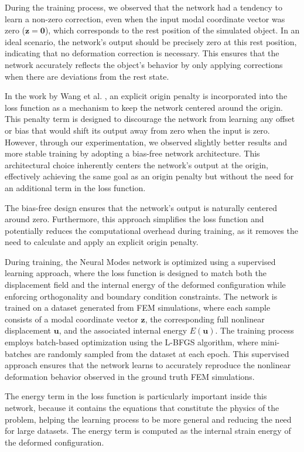 During the training process, we observed that the network had a tendency to learn a non-zero correction, even when the input modal coordinate vector was zero (\(\bm{z} = \bm{0}\)), which corresponds to the rest position of the simulated object. In an ideal scenario, the network's output should be precisely zero at this rest position, indicating that no deformation correction is necessary. This ensures that the network accurately reflects the object's behavior by only applying corrections when there are deviations from the rest state.

In the work by Wang et al. \cite{Wang_Du_Coros_Thomaszewski_2024}, an explicit origin penalty is incorporated into the loss function as a mechanism to keep the network centered around the origin. This penalty term is designed to discourage the network from learning any offset or bias that would shift its output away from zero when the input is zero. However, through our experimentation, we observed slightly better results and more stable training by adopting a bias-free network architecture. This architectural choice inherently centers the network's output at the origin, effectively achieving the same goal as an origin penalty but without the need for an additional term in the loss function.

The bias-free design ensures that the network's output is naturally centered around zero. Furthermore, this approach simplifies the loss function and potentially reduces the computational overhead during training, as it removes the need to calculate and apply an explicit origin penalty. 

During training, the Neural Modes network is optimized using a supervised learning approach, where the loss function is designed to match both the displacement field and the internal energy of the deformed configuration while enforcing orthogonality and boundary condition constraints. The network is trained on a dataset generated from FEM simulations, where each sample consists of a modal coordinate vector \( \bm{z} \), the corresponding full nonlinear displacement \( \bm{u} \), and the associated internal energy \( E(\bm{u}) \). The training process employs batch-based optimization using the L-BFGS algorithm, where mini-batches are randomly sampled from the dataset at each epoch. This supervised approach ensures that the network learns to accurately reproduce the nonlinear deformation behavior observed in the ground truth FEM simulations.

The energy term in the loss function is particularly important inside this network, because it contains the equations that constitute the physics of the problem, helping the learning process to be more general and reducing the need for large datasets. The energy term is computed as the internal strain energy of the deformed configuration.

